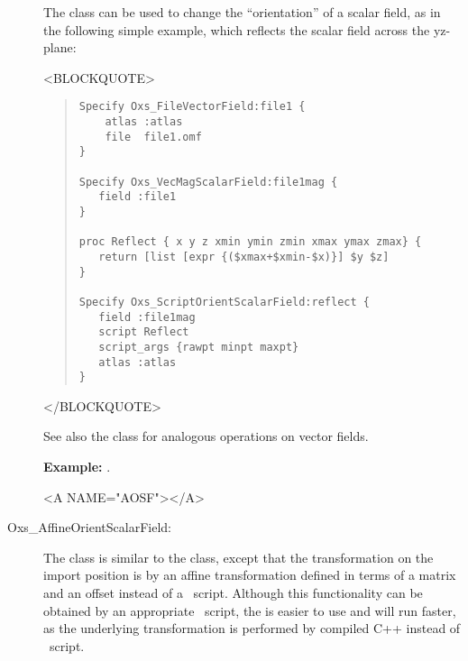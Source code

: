 \begin{description}
The  class can be used to change the
``orientation'' of a scalar field, as in the following simple example,
which reflects the  scalar field across the yz-plane:
\begin{rawhtml}<BLOCKQUOTE>\end{rawhtml}
\begin{quote}
\begin{verbatim}
Specify Oxs_FileVectorField:file1 {
    atlas :atlas
    file  file1.omf
}

Specify Oxs_VecMagScalarField:file1mag {
   field :file1
}

proc Reflect { x y z xmin ymin zmin xmax ymax zmax} {
   return [list [expr {($xmax+$xmin-$x)}] $y $z]
}

Specify Oxs_ScriptOrientScalarField:reflect {
   field :file1mag
   script Reflect
   script_args {rawpt minpt maxpt}
   atlas :atlas
}\end{verbatim}
\end{quote}
\begin{rawhtml}</BLOCKQUOTE>\end{rawhtml}
See also the
class for
analogous operations on vector fields.

\textbf{Example:} .

\begin{rawhtml}<A NAME="AOSF"></A>\end{rawhtml}%
%
\item[Oxs\_AffineOrientScalarField:\label{item:AffineOrientScalarField}]
The  class is similar to the
 class, except that the transformation
on the import position is by an affine transformation defined in terms
of a  matrix and an offset instead of a
\Tcl\ script.  Although this functionality can be obtained by an
appropriate \Tcl\ script, the  is
easier to use and will run faster, as the underlying transformation is
performed by compiled C++ instead of \Tcl\ script.


\end{description}
